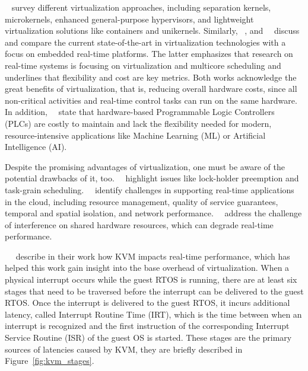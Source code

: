 \documentclass[MMR,Master,english]{style/twbook}
\begin{document}
\bigskip \noindent \citeauthor{cinqueVirtualizingMixedCriticalitySystems2022}~\cite{cinqueVirtualizingMixedCriticalitySystems2022} survey different virtualization approaches, including separation kernels, microkernels, enhanced general-purpose hypervisors, and lightweight virtualization solutions like containers and unikernels. Similarly, \citeauthor{sandstromVirtualizationTechnologiesEmbedded2013}~\cite{sandstromVirtualizationTechnologiesEmbedded2013}, and~\citeauthor{taccariEmbeddedRealTimeVirtualization2014}~\cite{taccariEmbeddedRealTimeVirtualization2014} discuss and compare the current state-of-the-art in virtualization technologies with a focus on embedded real-time platforms. The latter emphasizes that research on real-time systems is focusing on virtualization and multicore scheduling and underlines that flexibility and cost are key metrics. Both works acknowledge the great benefits of virtualization, that is, reducing overall hardware costs, since all non-critical activities and real-time control tasks can run on the same hardware. In addition,~\citeauthor{javierperezHowRealTime2022}~\cite{javierperezHowRealTime2022} state that hardware-based Programmable Logic Controllers (PLCs) are costly to maintain and lack the flexibility needed for modern, resource-intensive applications like Machine Learning (ML) or Artificial Intelligence (AI).

\bigskip \noindent Despite the promising advantages of virtualization, one must be aware of the potential drawbacks of it, too.~\citeauthor{guStateoftheArtSurveyRealTime2012}~\cite{guStateoftheArtSurveyRealTime2012} highlight issues like lock-holder preemption and task-grain scheduling.~\citeauthor{garcia-vallsChallengesRealtimeVirtualization2014}~\cite{garcia-vallsChallengesRealtimeVirtualization2014} identify challenges in supporting real-time applications in the cloud, including resource management, quality of service guarantees, temporal and spatial isolation, and network performance.~\citeauthor{scordinoRealTimeVirtualizationIndustrial2020}~\cite{scordinoRealTimeVirtualizationIndustrial2020} address the challenge of interference on shared hardware resources, which can degrade real-time performance.

\bigskip \noindent \citeauthor{maPerformanceTuningKVMbased2013}~\cite{maPerformanceTuningKVMbased2013}~\cite{junzhangPerformanceAnalysisKVMBased2010} describe in their work how KVM impacts real-time performance, which has helped this work gain insight into the base overhead of virtualization. When a physical interrupt occurs while the guest RTOS is running, there are at least six stages that need to be traversed before the interrupt can be delivered to the guest RTOS. Once the interrupt is delivered to the guest RTOS, it incurs additional latency, called Interrupt Routine Time (IRT), which is the time between when an interrupt is recognized and the first instruction of the corresponding Interrupt Service Routine (ISR) of the guest OS is started. These stages are the primary sources of latencies caused by KVM, they are briefly described in Figure~\ref{fig:kvm_stages}.
\end{document}
